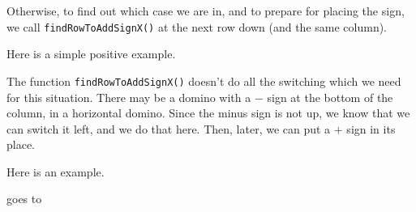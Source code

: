 \documentclass[12pt]{article}
\numberwithin{equation}{section}
\newcommand{\horizontalDominoMaybe}[3]{\filldraw [dominoMaybeStyle] (#2 - 1 + \eps, #1 - 1 + \eps) rectangle + (2 - \teps, 1 -\teps) node [dominoText] {$#3$};}
\newcommand{\verticalDominoMaybeShift}[4]{\filldraw [dominoMaybeStyle] (#2 - 1 + #4 + \eps,  #1 - 1 + \eps) rectangle + (1 - \teps,2 -\teps) node [dominoText] {$#3$};}
\begin{document}
\begin{itemize}
\begin{itemize}
      Otherwise, to find out which case we are in, and to prepare for placing the sign, we call \texttt{findRowToAddSignX()} at the next row down (and the same column).

      Here is a simple positive example.
      \begin{figure}[H]
        \centering
      \end{figure}

      The function \texttt{findRowToAddSignX()} doesn't do all the switching which we need for this situation.
      There may be a domino with a $-$ sign at the bottom of the column, in a horizontal domino.
      Since the minus sign is not up, we know that we can switch it left, and we do that here.
      Then, later, we can put a $+$ sign in its place.

      Here is an example.
      \begin{figure}[H]
        \centering
      \end{figure}
      goes to
      \begin{figure}[H]
        \centering
      \end{figure}
    \end{itemize}
  \end{itemize}
\end{document}

